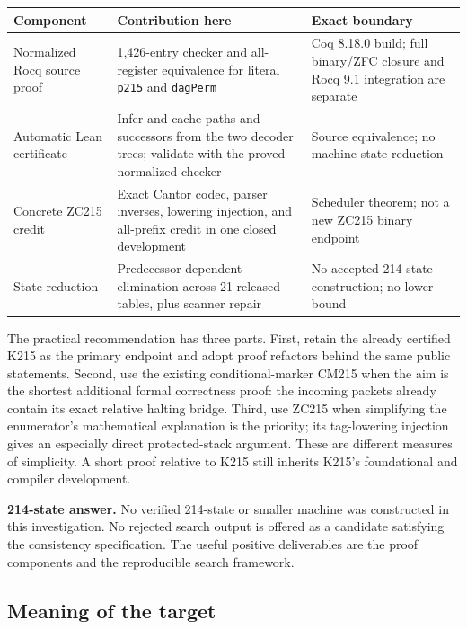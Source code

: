 \documentclass[11pt]{article}
\theoremstyle{definition}\newtheorem{definition}[theorem]{Definition}
\begin{document}
\begin{center}
\begin{tabular}{L{.24\textwidth}L{.39\textwidth}L{.27\textwidth}}
\toprule
Component & Contribution here & Exact boundary\\
\midrule
Normalized Rocq source proof & 1,426-entry checker and all-register equivalence
for literal \texttt{p215} and \texttt{dagPerm} & Coq 8.18.0 build; full binary/ZFC
closure and Rocq 9.1 integration are separate\\[3pt]
Automatic Lean certificate & Infer and cache paths and successors from the two
decoder trees; validate with the proved normalized checker & Source equivalence;
no machine-state reduction\\[3pt]
Concrete ZC215 credit & Exact Cantor codec, parser inverses, lowering injection,
and all-prefix credit in one closed development & Scheduler theorem; not a new
ZC215 binary endpoint\\[3pt]
State reduction & Predecessor-dependent elimination across 21 released tables,
plus scanner repair & No accepted 214-state construction; no lower bound\\
\bottomrule
\end{tabular}
\end{center}

The practical recommendation has three parts. First, retain the already
certified K215 as the primary endpoint and adopt proof refactors behind the
same public statements. Second, use the existing conditional-marker CM215
when the aim is the shortest additional formal correctness proof: the incoming
packets already contain its exact relative halting bridge. Third, use ZC215
when simplifying the enumerator's mathematical explanation is the priority;
its tag-lowering injection gives an especially direct protected-stack argument.
These are different measures of simplicity. A short proof relative to K215
still inherits K215's foundational and compiler development.

\textbf{214-state answer.} No verified 214-state or smaller machine was
constructed in this investigation. No rejected search output is offered as
a candidate satisfying the consistency specification. The useful positive
deliverables are the proof components and the reproducible search framework.

\subsection{Meaning of the target}
\end{document}
